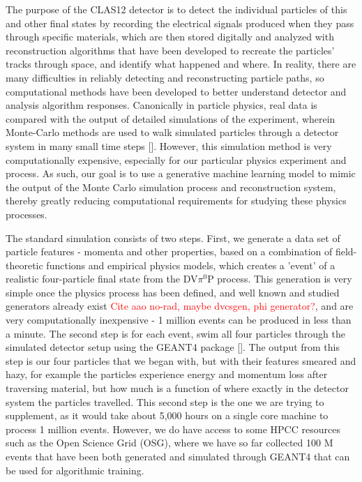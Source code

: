 \documentclass{article}
\begin{document}
\quad The purpose of the CLAS12 detector is to detect the individual particles of this and other final states by recording the electrical signals produced when they pass through specific materials, which are then stored digitally and analyzed with reconstruction algorithms that have been developed to recreate the particles' tracks through space, and identify what happened and where. In reality, there are many difficulties in reliably detecting and reconstructing particle paths, so computational methods have been developed to better understand detector and analysis algorithm responses. Canonically in particle physics, real data is compared with the output of detailed simulations of the experiment, wherein Monte-Carlo methods are used to walk simulated particles through a detector system in many small time steps [\citet{PhysRevLett.115.212003, 10.1093/ptep/ptaa104}]. However, this simulation method is very computationally expensive, especially for our particular physics experiment and process. As such, our goal is to use a generative machine learning model to mimic the output of the Monte Carlo simulation process and reconstruction system, thereby greatly reducing computational requirements for studying these physics processes. 


\quad  The standard simulation consists of two steps. First, we generate a data set of particle features - momenta and other properties, based on a combination of field-theoretic functions and empirical physics models, which creates a 'event' of a realistic four-particle final state from the DV$\pi^0$P process. This generation is very simple once the physics process has been defined, and well known and studied generators already exist \textcolor{red}{Cite aao no-rad, maybe dvcsgen, phi generator?}, and are very computationally inexpensive - 1 million events can be produced in less than a minute. The second step is for each event, swim all four particles through the simulated detector setup using the GEANT4 package [\citet{AGOSTINELLI2003250}]. The output from this step is our four particles that we began with, but with their features smeared and hazy, for example the particles experience energy and momentum loss after traversing material, but how much is a function of where exactly in the detector system the particles travelled. This second step is the one we are trying to supplement, as it would take about 5,000 hours on a single core machine to process 1 million events. However, we do have access to some HPCC resources such as the Open Science Grid (OSG), where we have so far collected 100 M events that have been both generated and simulated through GEANT4 that can be used for algorithmic training. 
\end{document}
